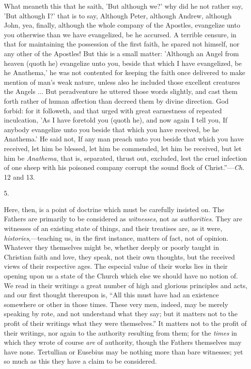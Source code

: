 What meaneth this that
he saith, 'But although we?' why did he not rather say, 'But although
I?' that is to say, Although Peter, although Andrew, although John,
yea, finally, although the whole company of the Apostles, evangelize
unto you otherwise than we have evangelized, be he accursed. A
terrible censure, in that for maintaining the possession of the first
faith, he spared not himself, nor any other of the Apostles! But this
is a small matter: 'Although an Angel from heaven (quoth he) evangelize unto you, beside that which I have
evangelized, be he Anathema,' he was not contented for keeping the
faith once delivered to make mention of man's weak nature, unless
also he included those excellent creatures the Angels ... But
peradventure he uttered those words slightly, and cast them forth
rather of human affection than decreed them by divine direction. God
forbid: for it followeth, and that urged with great earnestness of
repeated inculcation, 'As I have foretold you (quoth he), and now
again I tell you, If anybody evangelize unto you beside that which you
have received, be he Anathema.' He said not, If any man preach unto
you beside that which you have received, let him be blessed, let him
be commended, let him be received, but let him be \emph{Anathema},
that is, separated, thrust out, excluded, lest the cruel infection of
one sheep with his poisoned company corrupt the sound flock of
Christ.''—\emph{Ch}. 12 and 13.

5.

Here, then, is a point of doctrine which must be carefully insisted
on. The Fathers are primarily to be considered as \emph{witnesses},
not as \emph{authorities}. They are witnesses of an existing state of
things, and their treatises are, as it were, \emph{histories},—teaching
us, in the first instance, matters of fact, not of opinion. Whatever
they themselves might be, whether deeply or poorly taught in Christian
faith and love, they speak, not their own thoughts, but the received
views of their respective ages. The especial value of their works lies
in their opening upon us a state of the Church which else we should
have no notion of. We read in their writings a great number of high
and glorious principles and acts, and our first thought thereupon is,
``All this must have had an existence somewhere or other in those
times. These very men, indeed, may be merely speaking by rote, and not
understand what they say; but it matters not to the profit of their
writings what they were themselves.'' It matters not to the profit
of their writings, nor again to the authority resulting from
them; for the \emph{times} in which they wrote of course \emph{are} of
authority, though the Fathers themselves may have none. Tertullian or
Eusebius may be nothing more than bare witnesses; yet so much as this
they have a claim to be considered.

